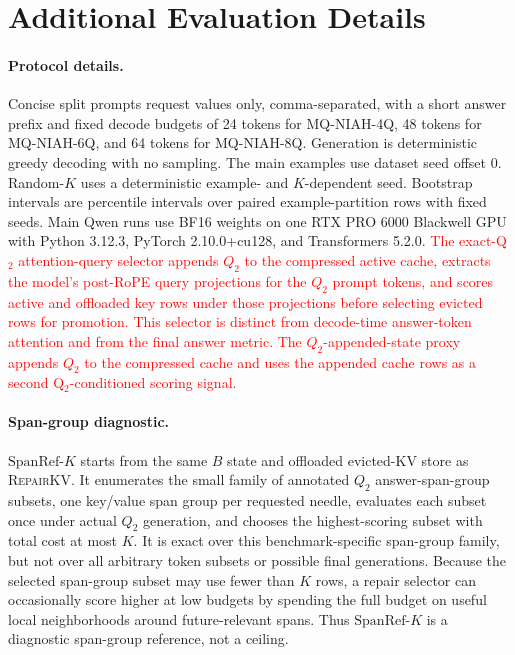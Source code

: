 \documentclass{article}
\newcommand{\repairkv}{\textsc{RepairKV}}
\newcommand{\spanref}{\ensuremath{\mathrm{SpanRef}\mbox{-}K}}
\begin{document}
\newpage
\appendix
\onecolumn
\raggedbottom

\section{Additional Evaluation Details}
\label{app:evaluation-details}

\paragraph{Protocol details.}
Concise split prompts request values only, comma-separated, with a short
answer prefix and fixed decode budgets of 24 tokens for MQ-NIAH-4Q,
48 tokens for MQ-NIAH-6Q, and 64 tokens for MQ-NIAH-8Q.
Generation is deterministic greedy decoding with no sampling.
The main examples use dataset seed offset 0.
Random-$K$ uses a
deterministic example- and $K$-dependent seed.
Bootstrap intervals are percentile intervals over paired
example-partition rows with fixed seeds.
Main Qwen runs use BF16 weights on one RTX PRO 6000 Blackwell GPU with
Python 3.12.3, PyTorch 2.10.0+cu128, and Transformers 5.2.0.
\textcolor{red}{The exact-Q$_2$ attention-query selector appends $Q_2$ to
the compressed active cache, extracts the model's post-RoPE query
projections for the $Q_2$ prompt tokens, and scores active and offloaded
key rows under those projections before selecting evicted rows for
promotion. This selector is distinct from decode-time answer-token
attention and from the final answer metric. The $Q_2$-appended-state proxy
appends $Q_2$ to the compressed cache and uses the appended cache rows as
a second Q$_2$-conditioned scoring signal.}

\paragraph{Span-group diagnostic.}
\spanref{} starts from the same $B$ state and offloaded evicted-KV store
as \repairkv{}.
It enumerates the small family of annotated $Q_2$ answer-span-group
subsets, one key/value span group per requested needle, evaluates each
subset once under actual $Q_2$ generation, and chooses the
highest-scoring subset with total cost at most $K$.
It is exact over this benchmark-specific span-group family, but not over
all arbitrary token subsets or possible final generations.
Because the selected span-group subset may use fewer than $K$ rows, a
repair selector can occasionally score higher at low budgets by spending
the full budget on useful local neighborhoods around future-relevant
spans. Thus \spanref{} is a diagnostic span-group reference, not a
ceiling. 
\end{document}
